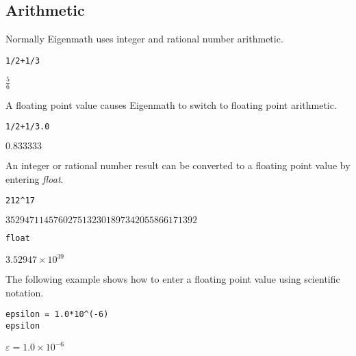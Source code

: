 
\subsection{Arithmetic}
Normally Eigenmath uses integer and rational number arithmetic.

\begin{Verbatim}[formatcom=\color{blue}]
1/2+1/3
\end{Verbatim}

$\displaystyle \frac{5}{6}$

A floating point value causes Eigenmath to switch to floating point arithmetic.

\begin{Verbatim}[formatcom=\color{blue}]
1/2+1/3.0
\end{Verbatim}

$\displaystyle 0.833333$

An integer or rational number result can be converted to a floating
point value by entering {\it float}.

\begin{Verbatim}[formatcom=\color{blue}]
212^17
\end{Verbatim}

$\displaystyle 3529471145760275132301897342055866171392$

\begin{Verbatim}[formatcom=\color{blue}]
float
\end{Verbatim}

$\displaystyle 3.52947\times10^{39}$

The following example shows how to enter a floating point value
using scientific notation.

\begin{Verbatim}[formatcom=\color{blue}]
epsilon = 1.0*10^(-6)
epsilon
\end{Verbatim}

$\displaystyle \varepsilon=1.0\times10^{-6}$
